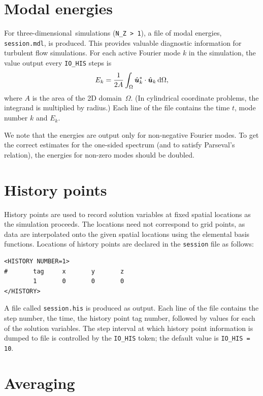 \documentclass[11pt]{report}
\newcommand\threed{three-di\-men\-sion\-al}
\begin{document}
\section{Modal energies}
\label{sec.modal}

For \threed\ simulations (\verb+N_Z > 1+), a file of modal energies,
\verb+session.mdl+, is produced.  This provides valuable diagnostic
information for turbulent flow simulations.  For each active Fourier
mode $k$ in the simulation, the value output every \verb+IO_HIS+ steps
is 
\[
E_k =
\frac{1}{2A}\int_\Omega
\hat{\bm{u}}_k^\ast\cdot\hat{\bm{u}}_k \,{\rm d}\Omega,
\]
where $A$ is the area of the 2D domain~$\Omega$.  (In cylindrical
coordinate problems, the integrand is multiplied by radius.) Each line
of the file contains the time $t$, mode number $k$ and $E_k$.

We note that the energies are output only for non-negative Fourier
modes.  To get the correct estimates for the one-sided spectrum (and
to satisfy Parseval's relation), the energies for non-zero modes
should be doubled.

\section{History points}
\label{sec.history}

History points are used to record solution variables at fixed spatial
locations as the simulation proceeds.  The locations need not
correspond to grid points, as data are interpolated onto the given
spatial locations using the elemental basis functions.  Locations of
history points are declared in the \verb+session+ file as follows:
%
{\small
\begin{verbatim}
<HISTORY NUMBER=1>
#       tag     x       y       z 
        1       0       0       0
</HISTORY>
\end{verbatim}
}
%
A file called \verb+session.his+ is produced as output.  Each line of
the file contains the step number, the time, the history point tag
number, followed by values for each of the solution variables.  The
step interval at which history point information is dumped to file is
controlled by the \verb+IO_HIS+ token; the default value is
\verb+IO_HIS = 10+.

\section{Averaging}
\label{sec.average}
\end{document}
